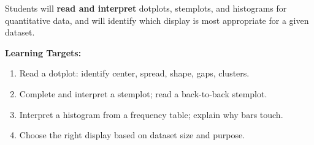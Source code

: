 \documentclass[aspectratio=169, 11pt]{beamer}
\begin{document}
{
\begin{frame}[t, plain]
  \vspace{0.45cm}\par
  \hspace{0.55cm}%
  \begin{minipage}{0.9\textwidth}


    \normalsize
    Students will \textbf{read and interpret} dotplots, stemplots, and histograms
    for quantitative data, and will identify which display is most appropriate for
    a given dataset.

    \vspace{0.5cm}
    \textbf{Learning Targets:}
    \begin{enumerate}\small
      \setlength{\itemsep}{0.4em}
      \item Read a dotplot: identify center, spread, shape, gaps, clusters.
      \item Complete and interpret a stemplot; read a back-to-back stemplot.
      \item Interpret a histogram from a frequency table; explain why bars touch.
      \item Choose the right display based on dataset size and purpose.
    \end{enumerate}
  \end{minipage}
\end{frame}
}
\end{document}
